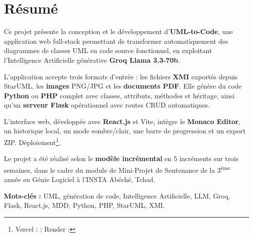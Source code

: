 \chapter*{Résumé}

Ce projet présente la conception et le développement d'\textbf{UML-to-Code}, une application web full-stack permettant de transformer automatiquement des diagrammes de classes UML en code source fonctionnel, en exploitant l'Intelligence Artificielle générative \textbf{Groq Llama 3.3-70b}\fnGroq.

L'application accepte trois formats d'entrée : les fichiers \textbf{XMI} exportés depuis StarUML, les \textbf{images} PNG/JPG et les \textbf{documents PDF}. Elle génère du code \textbf{Python} ou \textbf{PHP} complet avec classes, attributs, méthodes et héritage, ainsi qu'un \textbf{serveur Flask} opérationnel avec routes CRUD automatiques.

L'interface web, développée avec \textbf{React.js} et Vite, intègre le \textbf{Monaco Editor}, un historique local, un mode sombre/clair, une barre de progression et un export ZIP. Déploiement\footnote{Vercel :  ; Render : }.

Le projet a été réalisé selon le \textbf{modèle incrémental} en 5 incréments sur trois semaines, dans le cadre du module de Mini-Projet de Soutenance de la 3\textsuperscript{ème} année en Génie Logiciel à l'INSTA Abéché, Tchad.

\noindent\textbf{Mots-clés :} UML, génération de code, Intelligence Artificielle, LLM, Groq, Flask, React.js, MDD, Python, PHP, StarUML, XMI.